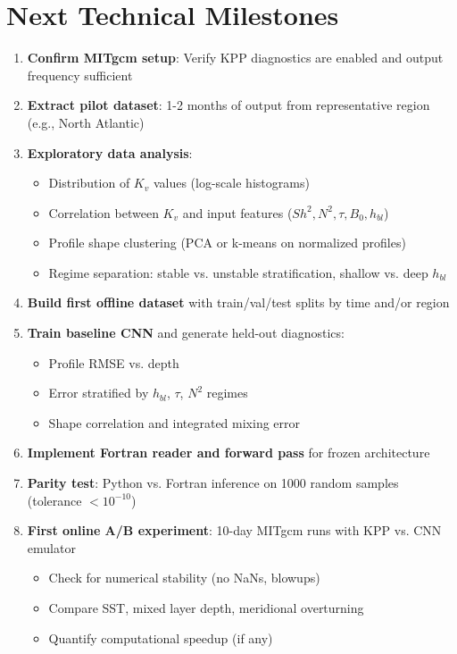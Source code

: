 \documentclass[11pt, a4paper]{article}
\begin{document}
\section{Next Technical Milestones}

\begin{enumerate}
    \item \textbf{Confirm MITgcm setup}: Verify KPP diagnostics are enabled and output frequency sufficient
    \item \textbf{Extract pilot dataset}: 1-2 months of output from representative region (e.g., North Atlantic)
    \item \textbf{Exploratory data analysis}:
    \begin{itemize}
        \item Distribution of $K_v$ values (log-scale histograms)
        \item Correlation between $K_v$ and input features ($Sh^2, N^2, \tau, B_0, h_{bl}$)
        \item Profile shape clustering (PCA or k-means on normalized profiles)
        \item Regime separation: stable vs. unstable stratification, shallow vs. deep $h_{bl}$
    \end{itemize}
    \item \textbf{Build first offline dataset} with train/val/test splits by time and/or region
    \item \textbf{Train baseline CNN} and generate held-out diagnostics:
    \begin{itemize}
        \item Profile RMSE vs. depth
        \item Error stratified by $h_{bl}$, $\tau$, $N^2$ regimes
        \item Shape correlation and integrated mixing error
    \end{itemize}
    \item \textbf{Implement Fortran reader and forward pass} for frozen architecture
    \item \textbf{Parity test}: Python vs. Fortran inference on 1000 random samples (tolerance $<10^{-10}$)
    \item \textbf{First online A/B experiment}: 10-day MITgcm runs with KPP vs. CNN emulator
    \begin{itemize}
        \item Check for numerical stability (no NaNs, blowups)
        \item Compare SST, mixed layer depth, meridional overturning
        \item Quantify computational speedup (if any)
    \end{itemize}
\end{enumerate}
\end{document}
